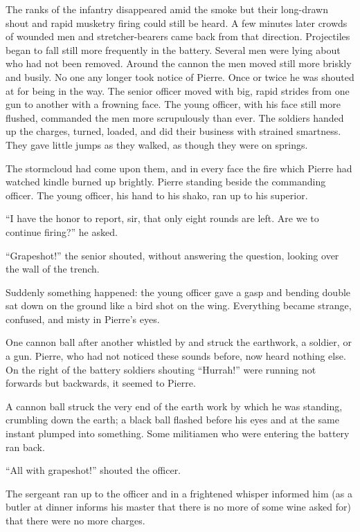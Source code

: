 The ranks of the infantry disappeared amid the smoke but their
long-drawn shout and rapid musketry firing could still be
heard. A few minutes later crowds of wounded men and
stretcher-bearers came back from that direction. Projectiles
began to fall still more frequently in the battery. Several men
were lying about who had not been removed. Around the cannon the
men moved still more briskly and busily. No one any longer took
notice of Pierre. Once or twice he was shouted at for being in
the way. The senior officer moved with big, rapid strides from
one gun to another with a frowning face. The young officer, with
his face still more flushed, commanded the men more scrupulously
than ever. The soldiers handed up the charges, turned, loaded,
and did their business with strained smartness. They gave little
jumps as they walked, as though they were on springs.

The stormcloud had come upon them, and in every face the fire
which Pierre had watched kindle burned up brightly. Pierre
standing beside the commanding officer. The young officer, his
hand to his shako, ran up to his superior.

``I have the honor to report, sir, that only eight rounds are
left. Are we to continue firing?'' he asked.

``Grapeshot!'' the senior shouted, without answering the
question, looking over the wall of the trench.

Suddenly something happened: the young officer gave a gasp and
bending double sat down on the ground like a bird shot on the
wing. Everything became strange, confused, and misty in Pierre's
eyes.

One cannon ball after another whistled by and struck the
earthwork, a soldier, or a gun. Pierre, who had not noticed these
sounds before, now heard nothing else. On the right of the
battery soldiers shouting ``Hurrah!'' were running not forwards
but backwards, it seemed to Pierre.

A cannon ball struck the very end of the earth work by which he
was standing, crumbling down the earth; a black ball flashed
before his eyes and at the same instant plumped into
something. Some militiamen who were entering the battery ran
back.

``All with grapeshot!'' shouted the officer.

The sergeant ran up to the officer and in a frightened whisper
informed him (as a butler at dinner informs his master that there
is no more of some wine asked for) that there were no more
charges.

